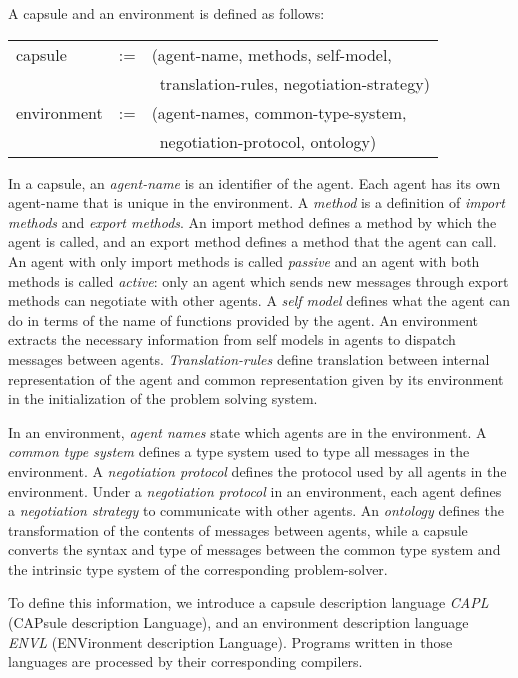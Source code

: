 A capsule and an environment is defined as follows:
\begin{center}
\begin{tabular}{lll}
capsule	   &:=&(agent-name, methods, self-model,\\
           &  &\ translation-rules, negotiation-strategy)\\
environment&:=&(agent-names, common-type-system,\\
           &  &\ negotiation-protocol, ontology)
\end{tabular}
\end{center}

In a capsule, an {\em agent-name} is an identifier of the agent.  Each
agent has its own agent-name that is unique in the environment.  A
{\em method} is a definition of {\em import methods} and {\em export
methods}. An import method defines a method by which the agent is
called, and an export method defines a method that the agent can call.
An agent with only import methods is called {\em passive} and an agent
with both methods is called {\em active}: only an agent which sends
new messages through export methods can negotiate with other agents.
A {\em self model} defines what the agent can do in terms of the name
of functions provided by the agent.  An environment extracts the
necessary information from self models in agents to dispatch messages
between agents.  {\em Translation-rules} define translation between
internal representation of the agent and common representation given
by its environment in the initialization of the problem solving
system.

In an environment, {\em agent names} state which agents are in the
environment.  A {\em common type system} defines a type system used to
type all messages in the environment.  A {\em negotiation protocol}
defines the protocol used by all agents in the environment.  Under a
{\em negotiation protocol} in an environment, each agent defines a
{\em negotiation strategy} to communicate with other agents.  An {\em
ontology} defines the transformation of the contents of messages
between agents, while a capsule converts the syntax and type of
messages between the common type system and the intrinsic type system
of the corresponding problem-solver.

To define this information, we introduce a capsule description
language {\em CAPL} (CAPsule description Language), and an environment
description language {\em ENVL} (ENVironment description Language). 
Programs written in those languages are processed by their
corresponding compilers.

